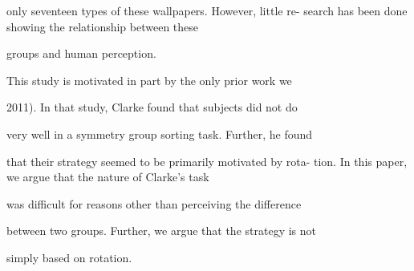 only seventeen types of these wallpapers. However, little re-
search has been done showing the relationship between these

groups and human perception.

This study is motivated in part by the only prior work we


2011). In that study, Clarke found that subjects did not do

very well in a symmetry group sorting task. Further, he found

that their strategy seemed to be primarily motivated by rota-
tion. In this paper, we argue that the nature of Clarke’s task

was difficult for reasons other than perceiving the difference

between two groups. Further, we argue that the strategy is not

simply based on rotation.